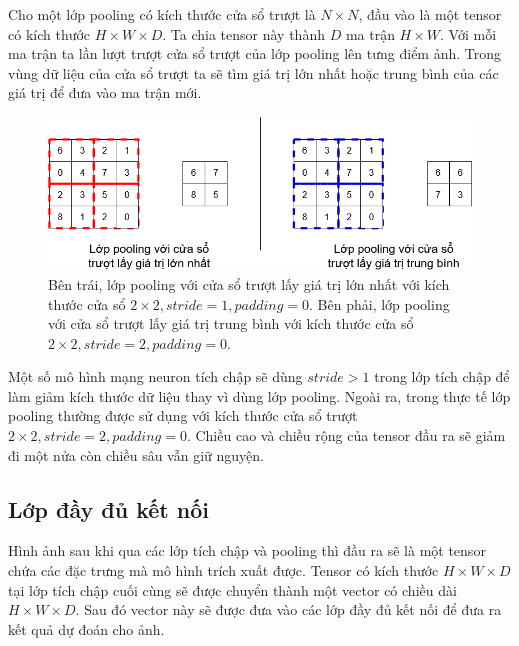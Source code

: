 Cho một lớp pooling có kích thước cửa sổ trượt là $N \times N$, đầu vào là một tensor có kích thước $H \times W \times D$. Ta chia tensor này thành $D$ ma trận $H \times W$. Với mỗi ma trận ta lần lượt trượt cửa sổ trượt của lớp pooling lên tưng điểm ảnh. Trong vùng dữ liệu của cửa sổ trượt ta sẽ tìm giá trị lớn nhất hoặc trung bình của các giá trị để đưa vào ma trận mới.
\begin{figure}[ht!]
	\centerline{\includegraphics[scale=0.4]{images/pooling.png}}
  	\caption{Bên trái, lớp pooling với cửa sổ trượt lấy giá trị lớn nhất với kích thước cửa sổ $2 \times 2, stride=1, padding=0$. Bên phải, lớp pooling với cửa sổ trượt lấy giá trị trung bình với kích thước cửa sổ $2 \times 2, stride=2, padding=0$.}
  	\label{fig:pooling}
\end{figure}
Một số mô hình mạng neuron tích chập sẽ dùng $stride>1$ trong lớp tích chập để làm giảm kích thước dữ liệu thay vì dùng lớp pooling. Ngoài ra, trong thực tế lớp pooling thường được sử dụng với kích thước cửa sổ trượt $2 \times 2, stride=2, padding=0$. Chiều cao và chiều rộng của tensor đầu ra sẽ giảm đi một nửa còn chiều sâu vẫn giữ nguyện.
\subsection{Lớp đầy đủ kết nối}
Hình ảnh sau khi qua các lớp tích chập và pooling thì đầu ra sẽ là một tensor chứa các đặc trưng mà mô hình trích xuất được. Tensor có kích thước $H \times W \times D$ tại lớp tích chập cuối cùng sẽ được chuyển thành một vector có chiều dài $H \times W \times D$. Sau đó vector này sẽ được đưa vào các lớp đầy đủ kết nối để đưa ra kết quả dự đoán cho ảnh.
